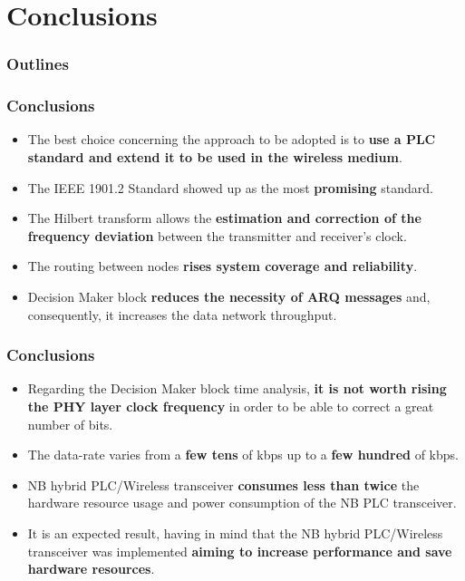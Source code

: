 \documentclass[mathserif]{beamer}
\newcommand{\wait}{\vfill}
\begin{document}
\section{Conclusions}
\begin{frame}
	\frametitle{Outlines}
	\small
	\tableofcontents[currentsection]
\end{frame}
\begin{frame}
	\frametitle{Conclusions}
	\begin{itemize}
		\item The best choice concerning the approach to be	adopted is to \textbf{use a PLC standard and extend it to be used in the wireless medium}. \wait
		\item The IEEE 1901.2 Standard showed up as the most \textbf{promising} standard. \wait
		\item The Hilbert transform allows the \textbf{estimation and correction of the frequency deviation} between the transmitter and receiver’s clock. \wait
		\item The routing between nodes \textbf{rises system coverage and reliability}. \wait
		\item Decision Maker block \textbf{reduces the necessity of ARQ messages} and, consequently, it increases the data network throughput.
	\end{itemize}
\end{frame}

\begin{frame}
\frametitle{Conclusions}
\begin{itemize}
	\item  Regarding the Decision Maker block time analysis, \textbf{it is not worth rising the PHY layer clock frequency} in order to be able to correct a great number of bits. \wait
	\item  The data-rate varies from a \textbf{few tens} of kbps up to a \textbf{few hundred} of kbps. \wait
	\item NB hybrid PLC/Wireless transceiver \textbf{consumes less than twice} the hardware resource usage and power consumption of the NB PLC transceiver. \wait
	\item  It is an expected result, having in mind that the NB hybrid PLC/Wireless transceiver was	implemented \textbf{aiming to increase performance and save hardware resources}.
\end{itemize}
\end{frame}
\end{document}
